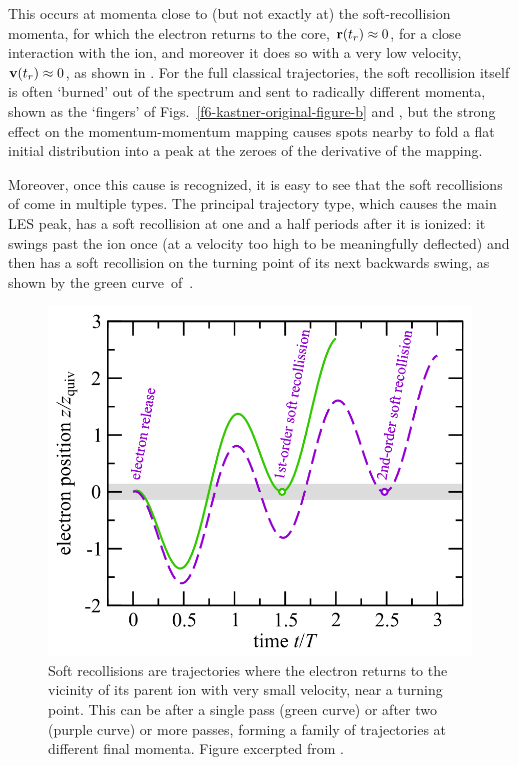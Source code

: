 This occurs at momenta close to (but not exactly at) the soft-recollision momenta, for which the electron returns to the core, $\vb{r}(t_r) \approx 0$, for a close interaction with the ion, and moreover it does so with a very low velocity, $\vb{v}(t_r)\approx 0$, as shown in . For the full classical trajectories, the soft recollision itself is often `burned' out of the spectrum and sent to radically different momenta, shown as the `fingers' of Figs.~\ref{f6-kastner-original-figure-b} and , but the strong effect on the momentum-momentum mapping causes spots nearby to fold a flat initial distribution into a peak at the zeroes of the derivative of the mapping.


Moreover, once this cause is recognized, it is easy to see that the soft recollisions of  come in multiple types. The principal trajectory type, which causes the main LES peak, has a soft recollision at one and a half periods after it is ionized: it swings past the ion once (at a velocity too high to be meaningfully deflected) and then has a soft recollision on the turning point of its next backwards swing, as shown by the green curve~of~.



\begin{figure}[b!]
\centering
\includegraphics[scale=1]{6-LES/Figures/figure6J.png}
  \caption[
  Soft recollisions as originally presented by A. Kästner et al.
  ]{
  Soft recollisions are trajectories where the electron returns to the vicinity of its parent ion with very small velocity, near a turning point. This can be after a single pass (green curve) or after two (purple curve) or more passes, forming a family of trajectories at different final momenta.
  Figure excerpted from .
  }
\label{f6-rost-soft-recollisions}
\end{figure}




